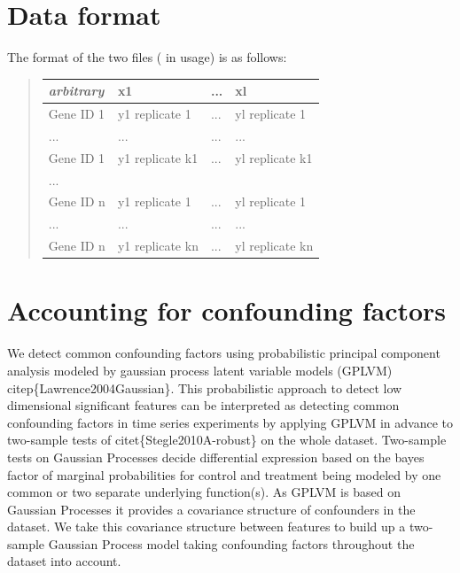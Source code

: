 \documentclass[letterpaper,10pt,english]{sphinxmanual}
\begin{document}
\chapter{Data format}
\label{usage:dataformat}\label{usage:data-format}
The format of the two  files ( in usage) is as follows:
\begin{quote}

\begin{tabulary}{\linewidth}{|L|L|L|L|}
\hline
\textbf{
\emph{arbitrary}
} & \textbf{
x1
} & \textbf{
...
} & \textbf{
xl
}\\\hline

Gene ID 1
 & 
y1 replicate 1
 & 
...
 & 
yl replicate 1
\\\hline

...
 & 
...
 & 
...
 & 
...
\\\hline

Gene ID 1
 & 
y1 replicate k1
 & 
...
 & 
yl replicate k1
\\\hline

...
 &  &  & \\\hline

Gene ID n
 & 
y1 replicate 1
 & 
...
 & 
yl replicate 1
\\\hline

...
 & 
...
 & 
...
 & 
...
\\\hline

Gene ID n
 & 
y1 replicate kn
 & 
...
 & 
yl replicate kn
\\\hline
\end{tabulary}

\end{quote}


\chapter{Accounting for confounding factors}
\label{confounders:accounting-for-confounding-factors}\label{confounders::doc}\label{confounders:confounders}
We detect common confounding factors using probabilistic principal component
analysis modeled by gaussian process latent variable models (GPLVM)
citep\{Lawrence2004Gaussian\}. This probabilistic approach to detect low
dimensional significant features can be interpreted as detecting
common confounding factors in time series experiments by applying
GPLVM in advance to two-sample tests of citet\{Stegle2010A-robust\} on the
whole dataset. Two-sample tests on Gaussian Processes decide
differential expression based on the bayes factor of marginal probabilities
for control and treatment being modeled by one common or two separate
underlying function(s). As GPLVM is based on Gaussian Processes it
provides a covariance structure of confounders in the dataset. We take
this covariance structure between features to build up a two-sample
Gaussian Process model taking confounding factors throughout the
dataset into account.
\end{document}
